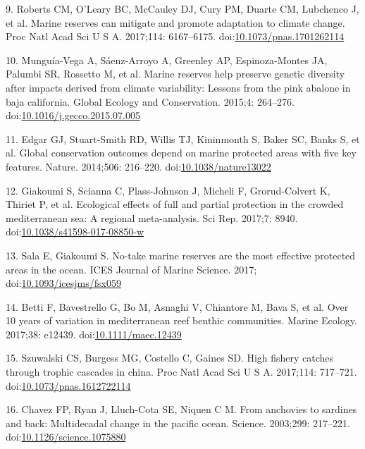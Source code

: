 \documentclass[12pt,]{article}
\begin{document}
\hypertarget{ref-roberts_2017-J9}{}
9. Roberts CM, O'Leary BC, McCauley DJ, Cury PM, Duarte CM, Lubchenco J,
et al. Marine reserves can mitigate and promote adaptation to climate
change. Proc Natl Acad Sci U S A. 2017;114: 6167--6175.
doi:\href{https://doi.org/10.1073/pnas.1701262114}{10.1073/pnas.1701262114}

\hypertarget{ref-munguavega_2015-yg}{}
10. Munguía-Vega A, Sáenz-Arroyo A, Greenley AP, Espinoza-Montes JA,
Palumbi SR, Rossetto M, et al. Marine reserves help preserve genetic
diversity after impacts derived from climate variability: Lessons from
the pink abalone in baja california. Global Ecology and Conservation.
2015;4: 264--276.
doi:\href{https://doi.org/10.1016/j.gecco.2015.07.005}{10.1016/j.gecco.2015.07.005}

\hypertarget{ref-edgar_2014-UO}{}
11. Edgar GJ, Stuart-Smith RD, Willis TJ, Kininmonth S, Baker SC, Banks
S, et al. Global conservation outcomes depend on marine protected areas
with five key features. Nature. 2014;506: 216--220.
doi:\href{https://doi.org/10.1038/nature13022}{10.1038/nature13022}

\hypertarget{ref-giakoumi_2017-V2}{}
12. Giakoumi S, Scianna C, Plass-Johnson J, Micheli F, Grorud-Colvert K,
Thiriet P, et al. Ecological effects of full and partial protection in
the crowded mediterranean sea: A regional meta-analysis. Sci Rep.
2017;7: 8940.
doi:\href{https://doi.org/10.1038/s41598-017-08850-w}{10.1038/s41598-017-08850-w}

\hypertarget{ref-sala_2017-69}{}
13. Sala E, Giakoumi S. No-take marine reserves are the most effective
protected areas in the ocean. ICES Journal of Marine Science. 2017;
doi:\href{https://doi.org/10.1093/icesjms/fsx059}{10.1093/icesjms/fsx059}

\hypertarget{ref-betti_2017-lq}{}
14. Betti F, Bavestrello G, Bo M, Asnaghi V, Chiantore M, Bava S, et al.
Over 10 years of variation in mediterranean reef benthic communities.
Marine Ecology. 2017;38: e12439.
doi:\href{https://doi.org/10.1111/maec.12439}{10.1111/maec.12439}

\hypertarget{ref-szuwalski_2017-jc}{}
15. Szuwalski CS, Burgess MG, Costello C, Gaines SD. High fishery
catches through trophic cascades in china. Proc Natl Acad Sci U S A.
2017;114: 717--721.
doi:\href{https://doi.org/10.1073/pnas.1612722114}{10.1073/pnas.1612722114}

\hypertarget{ref-chavez_2003-_m}{}
16. Chavez FP, Ryan J, Lluch-Cota SE, Niquen C M. From anchovies to
sardines and back: Multidecadal change in the pacific ocean. Science.
2003;299: 217--221.
doi:\href{https://doi.org/10.1126/science.1075880}{10.1126/science.1075880}
\end{document}
